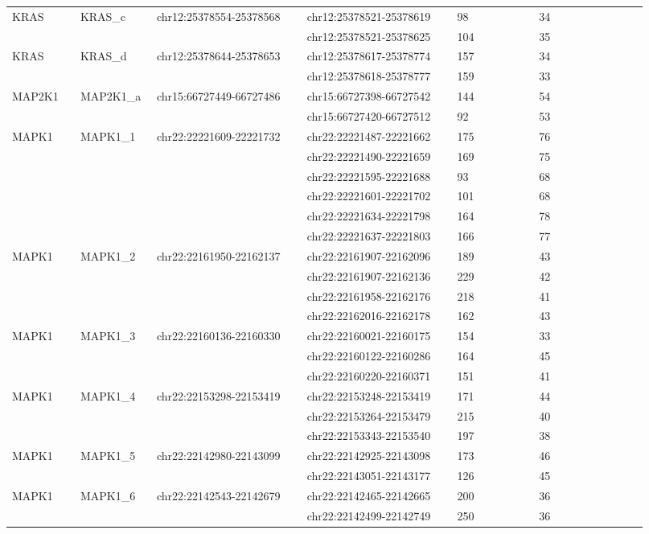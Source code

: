 \begin{landscape}
\begin{longtable}{p{0.1\linewidth}|p{0.1\linewidth}p{0.22\linewidth}p{0.22\linewidth}p{0.12\linewidth}p{0.16\linewidth}}
\\
KRAS & KRAS\_c & chr12:25378554-25378568 & chr12:25378521-25378619 & 98 & 34
\\
 & & & chr12:25378521-25378625 & 104 & 35
\\
KRAS & KRAS\_d & chr12:25378644-25378653 & chr12:25378617-25378774 & 157 & 34
\\
 & & & chr12:25378618-25378777 & 159 & 33
\\
\hline
MAP2K1 & MAP2K1\_a & chr15:66727449-66727486 & chr15:66727398-66727542 & 144 & 54
\\
 & & & chr15:66727420-66727512 & 92 & 53
\\
\hline
MAPK1 & MAPK1\_1 & chr22:22221609-22221732 & chr22:22221487-22221662 & 175 & 76
\\
 & & & chr22:22221490-22221659 & 169 & 75
\\
 & & & chr22:22221595-22221688 & 93 & 68
\\
 & & & chr22:22221601-22221702 & 101 & 68
\\
 & & & chr22:22221634-22221798 & 164 & 78
\\
 & & & chr22:22221637-22221803 & 166 & 77
\\
MAPK1 & MAPK1\_2 & chr22:22161950-22162137 & chr22:22161907-22162096 & 189 & 43
\\
 & & & chr22:22161907-22162136 & 229 & 42
\\
 & & & chr22:22161958-22162176 & 218 & 41
\\
 & & & chr22:22162016-22162178 & 162 & 43
\\
MAPK1 & MAPK1\_3 & chr22:22160136-22160330 & chr22:22160021-22160175 & 154 & 33
\\
 & & & chr22:22160122-22160286 & 164 & 45
\\
 & & & chr22:22160220-22160371 & 151 & 41
\\
MAPK1 & MAPK1\_4 & chr22:22153298-22153419 & chr22:22153248-22153419 & 171 & 44
\\
 & & & chr22:22153264-22153479 & 215 & 40
\\
 & & & chr22:22153343-22153540 & 197 & 38
\\
MAPK1 & MAPK1\_5 & chr22:22142980-22143099 & chr22:22142925-22143098 & 173 & 46
\\
 & & & chr22:22143051-22143177 & 126 & 45
\\
MAPK1 & MAPK1\_6 & chr22:22142543-22142679 & chr22:22142465-22142665 & 200 & 36
\\
 & & & chr22:22142499-22142749 & 250 & 36
\\

\end{longtable}
\end{landscape}
